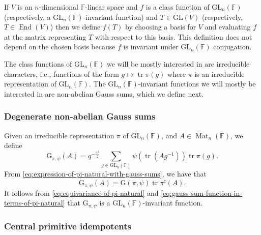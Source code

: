 \documentclass[12pt, reqno]{amsart}
\theoremstyle{definition}
\newcommand{\EndomorphismRing}{\operatorname{End}}
\newcommand{\fieldCharacter}{\psi}
\newcommand{\trace}{\operatorname{tr}}
\newcommand{\GL}{\mathrm{GL}}
\newcommand{\finiteField}{\mathbb{F}}
\newcommand{\squareMatrix}{\operatorname{Mat}}
\newcommand{\GaussSumScalar}[2]{\mathrm{G}\left(#1, #2\right)}
\newcommand{\GaussSumScalarFunction}[2]{\mathrm{G}_{#1, #2}}
\begin{document}
	If $V$ is an $n$-dimensional $\finiteField$-linear space and $f$ is a class function of $\GL_n\left(\finiteField\right)$ (respectively, a $\GL_n\left(\finiteField\right)$-invariant function) and $T \in \GL\left(V\right)$ (respectively, $T \in \EndomorphismRing\left(V\right)$) then we define $f\left(T\right)$ by choosing a basis for $V$ and evaluating $f$ at the matrix representing $T$ with respect to this basis. This definition does not depend on the chosen basis because $f$ is invariant under $\GL_n\left(\finiteField\right)$ conjugation.
	
	The class functions of $\GL_n\left(\finiteField\right)$ we will be mostly interested in are irreducible characters, i.e., functions of the form $g \mapsto \trace \pi\left(g\right)$ where $\pi$ is an irreducible representation of $\GL_n\left(\finiteField\right)$. The $\GL_n\left(\finiteField\right)$-invariant functions we will mostly be interested in are non-abelian Gauss sums, which we define next.
	
	\subsubsection{Degenerate non-abelian Gauss sums}\label{subsubsec:degenerate-non-abelian-gauss-sums}
	Given an irreducible representation $\pi$ of $\GL_n\left(\finiteField\right)$, and $A \in \squareMatrix_n\left(\finiteField\right)$, we define
	\begin{displaymath}
		\GaussSumScalarFunction{\pi}{\fieldCharacter}\left(A\right) = q^{-\frac{n^2}{2}} \sum_{g \in \GL_n\left(\finiteField\right)} \fieldCharacter\left(\trace\left(A g^{-1}\right)\right) \trace \pi\left(g\right).
	\end{displaymath}
	From \eqref{eq:expression-of-pi-natural-with-gauss-sums}, we have that
	\begin{equation}\label{eq:gauss-sum-function-in-terms-of-pi-natural}
		\GaussSumScalarFunction{\pi}{\fieldCharacter}\left(A\right) = \GaussSumScalar{\pi}{\fieldCharacter} \trace \pi^{\natural}\left(A\right).
	\end{equation}
	It follows from \eqref{eq:equivariance-of-pi-natural} and \eqref{eq:gauss-sum-function-in-terms-of-pi-natural} that $\GaussSumScalarFunction{\pi}{\fieldCharacter}$ is a $\GL_n\left(\finiteField\right)$-invariant function.
	
	\subsubsection{Central primitive idempotents}\label{subsubsec:central-primitive-idempotents}
	
\end{document}
